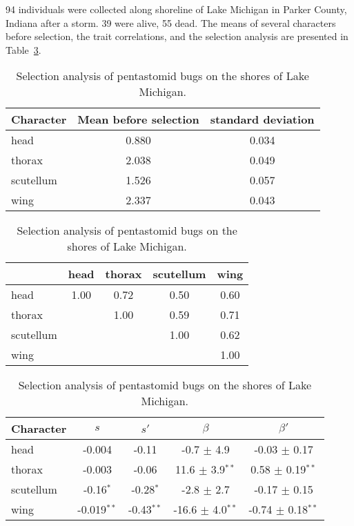 94 individuals were collected along shoreline of Lake Michigan in
Parker County, Indiana after a storm. 39 were alive, 55 dead. The
means of several characters before selection, the trait correlations,
and the selection analysis are presented in
Table~\ref{table:data}.

\begin{table}
\begin{center}
\begin{tabular}{l|cc}
\hline\hline
Character & Mean before selection & standard deviation \\
\hline
head      & 0.880                 & 0.034 \\
thorax    & 2.038                 & 0.049 \\
scutellum & 1.526                 & 0.057 \\
wing      & 2.337                 & 0.043 \\
\hline
\end{tabular}
\vskip 4pt
\begin{tabular}{l|cccc}
\hline\hline
          & head & thorax & scutellum & wing \\
\hline
head      & 1.00 & 0.72   & 0.50      & 0.60 \\
thorax    &      & 1.00   & 0.59      & 0.71 \\
scutellum &      &        & 1.00      & 0.62 \\
wing      &      &        &           & 1.00 \\
\hline
\end{tabular}
\vskip 4pt
\begin{tabular}{l|cccc}
\hline\hline
Character & $s$    & $s'$  & $\beta$ & $\beta'$ \\
\hline
head      & -0.004 & -0.11 & -0.7 $\pm$ 4.9 & -0.03 $\pm$ 0.17 \\
thorax    & -0.003 & -0.06 & 11.6 $\pm$ 3.9$^{**}$ & 0.58 $\pm$ 0.19$^{**}$
\\
scutellum & -0.16$^*$ & -0.28$^*$ & -2.8 $\pm$ 2.7 & -0.17 $\pm$ 0.15 \\
wing      & -0.019$^{**}$ & -0.43$^{**}$ & -16.6 $\pm$ 4.0$^{**}$ & -0.74 $\pm$
0.18$^{**}$ \\
\hline
\end{tabular}
\end{center}
\caption{Selection analysis of pentastomid bugs on the shores of Lake
Michigan.}\label{table:data}
\end{table}

